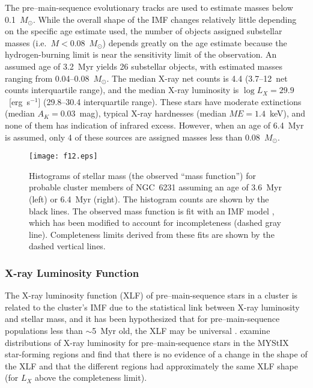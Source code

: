 \documentclass[twocolumn,tighten]{aastex61}
\begin{document}
The \citet{1998A&A...337..403B} pre--main-sequence evolutionary tracks are used to estimate masses below 0.1~$M_\odot$. While the overall shape of the IMF changes relatively little depending on the specific age estimate used, the number of objects assigned substellar masses (i.e.\ $M<0.08$~$M_\odot$) depends greatly on the age estimate because the hydrogen-burning limit is near the sensitivity limit of the observation. An assumed age of 3.2~Myr yields 26 substellar objects, with estimated masses ranging from 0.04--0.08~$M_\odot$. The median X-ray net counts is 4.4 (3.7--12~net counts interquartile range), and the median X-ray luminosity is $\log L_X=29.9$~[erg~s$^{-1}$] (29.8--30.4 interquartile range). These stars have moderate extinctions (median $A_K=0.03$~mag), typical X-ray hardnesses (median $ME=1.4$~keV), and none of them has indication of infrared excess. However, when an age of 6.4~Myr is assumed, only 4 of these sources are assigned masses less than 0.08~$M_\odot$.

\begin{figure*}
\centering
\texttt{[image: f12.eps]} 
\caption{Histograms of stellar mass (the observed ``mass function'') for probable cluster members of NGC~6231 assuming an age of 3.6~Myr (left) or 6.4~Myr (right). The histogram counts are shown by the black lines. The observed mass function is fit with an IMF model \citep[gray line;][]{2013MNRAS.429.1725M}, which has been modified to account for incompleteness (dashed gray line). Completeness limits derived from these fits are shown by the dashed vertical lines. 
 \label{imf.fig}}
\end{figure*}


\subsubsection{X-ray Luminosity Function}

The X-ray luminosity function (XLF) of pre--main-sequence stars in a cluster is related to the cluster's IMF due to the statistical link between X-ray luminosity and stellar mass, and it has been hypothesized that for pre--main-sequence populations less than $\sim$5~Myr old, the XLF may be universal \citep{2005ApJS..160..379F}. \citet{2015ApJ...802...60K} examine distributions of X-ray luminosity for pre--main-sequence stars in the MYStIX star-forming regions and find that there is no evidence of a change in the shape of the XLF and that the different regions had approximately the same XLF shape (for $L_X$ above the completeness limit).
\end{document}
